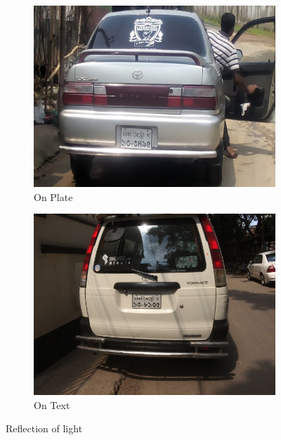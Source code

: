 \documentclass{standalone}
\begin{document}
\begin{figure}
\begin{subfigure}{0.5\textwidth}
    \centering
    \includegraphics[width=0.9\linewidth]{./img/experiment/stage.1/light}
    \caption{On Plate}
\end{subfigure}
\begin{subfigure}{0.5\textwidth}
    \centering
    \includegraphics[width=0.9\linewidth]{./img/experiment/stage.1/light2}
    \caption{On Text}
\end{subfigure}
\caption{Reflection of light}
\end{figure}
\end{document}
